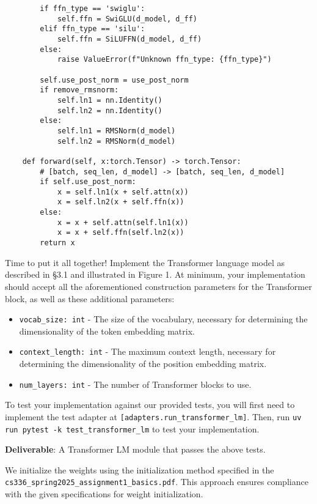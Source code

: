 \begin{lstlisting}
        if ffn_type == 'swiglu':
            self.ffn = SwiGLU(d_model, d_ff)
        elif ffn_type == 'silu':
            self.ffn = SiLUFFN(d_model, d_ff)
        else:
            raise ValueError(f"Unknown ffn_type: {ffn_type}")

        self.use_post_norm = use_post_norm
        if remove_rmsnorm:
            self.ln1 = nn.Identity()
            self.ln2 = nn.Identity()
        else:
            self.ln1 = RMSNorm(d_model)
            self.ln2 = RMSNorm(d_model)
        
    def forward(self, x:torch.Tensor) -> torch.Tensor:
        # [batch, seq_len, d_model] -> [batch, seq_len, d_model]
        if self.use_post_norm:
            x = self.ln1(x + self.attn(x))
            x = self.ln2(x + self.ffn(x))
        else:
            x = x + self.attn(self.ln1(x))
            x = x + self.ffn(self.ln2(x))
        return x
\end{lstlisting}


Time to put it all together! Implement the Transformer language model as described in §3.1 and illustrated in Figure 1. At minimum, your implementation should accept all the aforementioned construction parameters for the Transformer block, as well as these additional parameters:

\begin{itemize}
    \item \lstinline{vocab_size: int} - The size of the vocabulary, necessary for determining the dimensionality of the token embedding matrix.
    \item \lstinline{context_length: int} - The maximum context length, necessary for determining the dimensionality of the position embedding matrix.
    \item \lstinline{num_layers: int} - The number of Transformer blocks to use.
\end{itemize}

To test your implementation against our provided tests, you will first need to implement the test adapter at \lstinline{[adapters.run_transformer_lm]}. Then, run \lstinline{uv run pytest -k test_transformer_lm} to test your implementation.

\textbf{Deliverable}: A Transformer LM module that passes the above tests.

\begin{note}
    We initialize the weights using the initialization method specified in the \lstinline{cs336_spring2025_assignment1_basics.pdf}.
    This approach ensures compliance with the given specifications for weight initialization.
\end{note}

